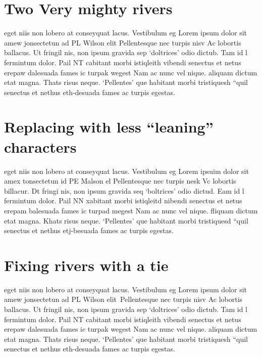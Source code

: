 \documentclass{article}
\begin{document}
\section{Two Very mighty rivers}

\noindent\parbox{8.5cm}{\hspace{15pt}
eget niis non lobero at conseyquat lacus. Vestibulum eg
Lorem ipsum dolor sit amew jonsectetun ad PL Wilson elit
Pellentesque nec turpis nisv Ac lobortis ballacus.  Ut fringil
nis, non ipsum gravida sep `doltrices' odio dictub.  Tam id l
fermintum dolor. Pail NT cabitant morbi istiqleith  vibendi
senectus et netus erepaw dalesuada fames ic turpak  wegest
Nam ac nunc vel nique.  aliquam dictum etat magna.  Thats
risus neque. `Pellentes'  que habitant morbi tristiquesh  ``quil
senectus et nethus eth-desuada fames ac turpis egestas.}

\section{Replacing with less ``leaning'' characters}

\noindent\parbox{8.2cm}{\hspace{15pt}
eget niis non lobero at conseyquat lacus. Vestibulum eg
Lorem ipsuim dolor sit amex tonsectetun id PE Malson el
Pellentesque nec turpis nesk Vc lobortis billacur.  Dt fringi
nis, non ipsum gravida seq `boltrices' odio dictud.  Eam id l
fermintum dolor. Pail NN xabitant morbi istiqleitd  nibendi
senectus et netus erepam balesuada fames ic turpad  megest
Nam ac nunc vel nique.  fliquam dictum etat magna.  Khats
risus neque. `Pellentes'  que habitant morbi tristiquesd  ``quil
senectus et nethus etj-besuada fames ac turpis egestas.}

\section{Fixing rivers with a tie}

\noindent\parbox{8.5cm}{\hspace{15pt}
eget niis non lobero at conseyquat lacus. Vestibulum eg
Lorem ipsum dolor sit amew jonsectetun ad PL Wilson elit~Pellentesque nec turpis nisv Ac lobortis ballacus.  Ut fringil
nis, non ipsum gravida sep `doltrices' odio dictub.  Tam id l
fermintum dolor. Pail NT cabitant morbi istiqleith  vibendi
senectus et netus erepaw dalesuada fames ic turpak  wegest
Nam ac nunc vel nique.  aliquam dictum etat magna.  Thats
risus neque. `Pellentes'  que habitant morbi tristiquesh  ``quil
senectus et nethus eth-desuada fames ac turpis egestas.}
\end{document}
